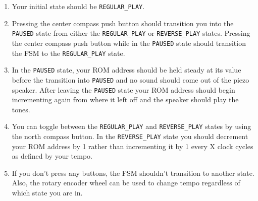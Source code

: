 \documentclass[11pt]{article}
\begin{document}
\begin{center}
\end{center}

\begin{enumerate}
	\item Your initial state should be \verb|REGULAR_PLAY|. 
	
	\item Pressing the center compass push button should transition you into the \verb|PAUSED| state from either the \verb|REGULAR_PLAY| or \verb|REVERSE_PLAY| states. Pressing the center compass push button while in the \verb|PAUSED| state should transition the FSM to the \verb|REGULAR_PLAY| state.
	
	\item In the \verb|PAUSED| state, your ROM address should be held steady at its value before the transition into \verb|PAUSED| and no sound should come out of the piezo speaker. After leaving the \verb|PAUSED| state your ROM address should begin incrementing again from where it left off and the speaker should play the tones.
	
	\item You can toggle between the \verb|REGULAR_PLAY| and \verb|REVERSE_PLAY| states by using the north compass button. In the \verb|REVERSE_PLAY| state you should decrement your ROM address by 1 rather than incrementing it by 1 every X clock cycles as defined by your tempo.
	
	\item If you don't press any buttons, the FSM shouldn't transition to another state. Also, the rotary encoder wheel can be used to change tempo regardless of which state you are in.
\end{enumerate}
\end{document}
